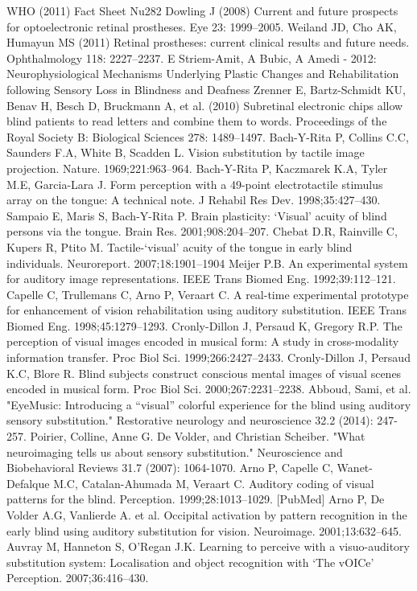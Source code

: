 \documentclass{article}
\begin{document}
\begin{thebibliography}{9}

  WHO (2011) Fact Sheet Nu282
Dowling J (2008) Current and future prospects for optoelectronic retinal prostheses. Eye 23: 1999–2005.
Weiland JD, Cho AK, Humayun MS (2011) Retinal prostheses: current clinical results and future needs. Ophthalmology 118: 2227–2237.
E Striem-Amit, A Bubic, A Amedi - 2012: Neurophysiological Mechanisms Underlying Plastic Changes and Rehabilitation following Sensory Loss in Blindness and Deafness
Zrenner E, Bartz-Schmidt KU, Benav H, Besch D, Bruckmann A, et al. (2010) Subretinal electronic chips allow blind patients to read letters and combine them to words. Proceedings of the Royal Society B: Biological Sciences 278: 1489–1497.
Bach-Y-Rita P, Collins C.C, Saunders F.A, White B, Scadden L. Vision substitution by tactile image projection. Nature. 1969;221:963–964. 
Bach-Y-Rita P, Kaczmarek K.A, Tyler M.E, Garcia-Lara J. Form perception with a 49-point electrotactile stimulus array on the tongue: A technical note. J Rehabil Res Dev. 1998;35:427–430.
Sampaio E, Maris S, Bach-Y-Rita P. Brain plasticity: ‘Visual’ acuity of blind persons via the tongue. Brain Res. 2001;908:204–207. 
Chebat D.R, Rainville C, Kupers R, Ptito M. Tactile-‘visual’ acuity of the tongue in early blind individuals. Neuroreport. 2007;18:1901–1904
Meijer P.B. An experimental system for auditory image representations. IEEE Trans Biomed Eng. 1992;39:112–121.
Capelle C, Trullemans C, Arno P, Veraart C. A real-time experimental prototype for enhancement of vision rehabilitation using auditory substitution. IEEE Trans Biomed Eng. 1998;45:1279–1293. 
Cronly-Dillon J, Persaud K, Gregory R.P. The perception of visual images encoded in musical form: A study in cross-modality information transfer. Proc Biol Sci. 1999;266:2427–2433. 
Cronly-Dillon J, Persaud K.C, Blore R. Blind subjects construct conscious mental images of visual scenes encoded in musical form. Proc Biol Sci. 2000;267:2231–2238.
Abboud, Sami, et al. "EyeMusic: Introducing a “visual” colorful experience for the blind using auditory sensory substitution." Restorative neurology and neuroscience 32.2 (2014): 247-257.
Poirier, Colline, Anne G. De Volder, and Christian Scheiber. "What neuroimaging tells us about sensory substitution." Neuroscience and Biobehavioral Reviews 31.7 (2007): 1064-1070.
Arno P, Capelle C, Wanet-Defalque M.C, Catalan-Ahumada M, Veraart C. Auditory coding of visual patterns for the blind. Perception. 1999;28:1013–1029. [PubMed]
Arno P, De Volder A.G, Vanlierde A. et al. Occipital activation by pattern recognition in the early blind using auditory substitution for vision. Neuroimage. 2001;13:632–645.
Auvray M, Hanneton S, O’Regan J.K. Learning to perceive with a visuo-auditory substitution system: Localisation and object recognition with ‘The vOICe’ Perception. 2007;36:416–430.

\end{thebibliography}
\end{document}
